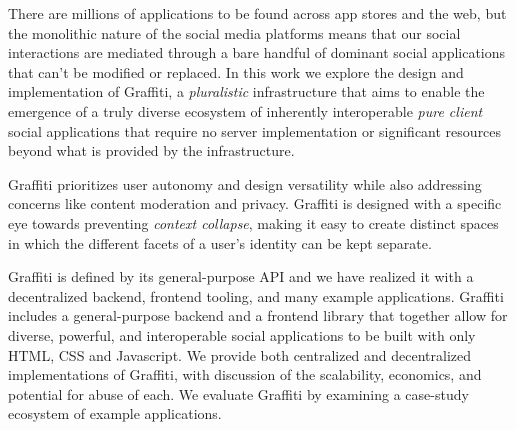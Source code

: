 There are millions of applications to be found across app stores and the web, but the monolithic nature of the social media platforms means that our social interactions are mediated through a bare handful of dominant social applications that can't be modified or replaced.
In this work we explore the design and implementation of Graffiti, a \emph{pluralistic} infrastructure that aims to enable the emergence of a truly diverse ecosystem of inherently interoperable \emph{pure client} social applications that require no server implementation or significant resources beyond what is provided by the infrastructure.

Graffiti prioritizes user autonomy and design versatility while also addressing concerns like content moderation and privacy. Graffiti is designed with a specific eye towards preventing \emph{context collapse}, making it easy to create distinct spaces in which the different facets of a user's identity can be kept separate.

Graffiti is defined by its general-purpose API and we have realized it with a decentralized backend, frontend tooling, and many example applications.
Graffiti includes a general-purpose backend and a frontend library that together allow for diverse, powerful, and interoperable social applications to be built with only HTML, CSS and Javascript.  We provide both centralized and decentralized implementations of Graffiti, with discussion of the scalability, economics, and potential for abuse of each.
We evaluate Graffiti by examining a case-study ecosystem of example applications.
